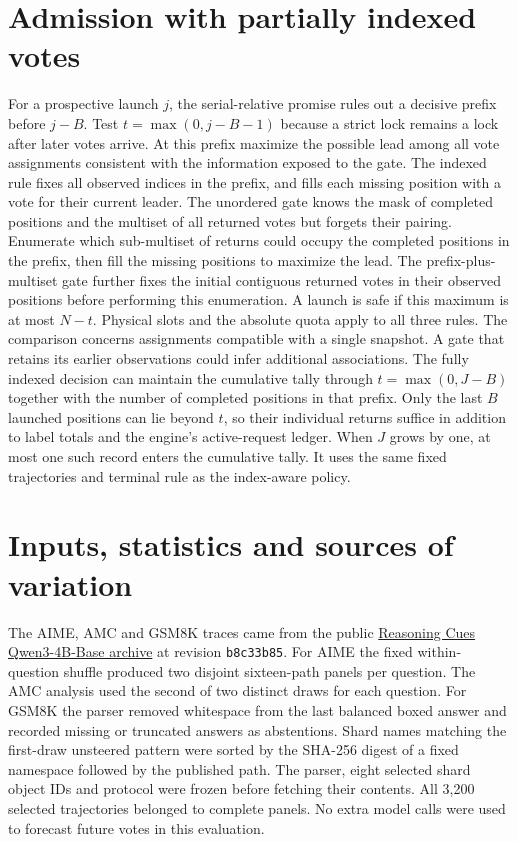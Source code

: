 \section{Admission with partially indexed votes}\label{app:bag}
For a prospective launch $j$, the serial-relative promise rules out a decisive prefix before $j-B$. Test $t=\max(0,j-B-1)$ because a strict lock remains a lock after later votes arrive. At this prefix maximize the possible lead among all vote assignments consistent with the information exposed to the gate. The indexed rule fixes all observed indices in the prefix, and fills each missing position with a vote for their current leader. The unordered gate knows the mask of completed positions and the multiset of all returned votes but forgets their pairing. Enumerate which sub-multiset of returns could occupy the completed positions in the prefix, then fill the missing positions to maximize the lead. The prefix-plus-multiset gate further fixes the initial contiguous returned votes in their observed positions before performing this enumeration. A launch is safe if this maximum is at most $N-t$. Physical slots and the absolute quota apply to all three rules. The comparison concerns assignments compatible with a single snapshot. A gate that retains its earlier observations could infer additional associations. The fully indexed decision can maintain the cumulative tally through $t=\max(0,J-B)$ together with the number of completed positions in that prefix. Only the last $B$ launched positions can lie beyond $t$, so their individual returns suffice in addition to label totals and the engine's active-request ledger. When $J$ grows by one, at most one such record enters the cumulative tally. It uses the same fixed trajectories and terminal rule as the index-aware policy.

\section{Inputs, statistics and sources of variation}\label{app:data}
The AIME, AMC and GSM8K traces came from the public \href{https://huggingface.co/datasets/reasoning-cues/rollouts-qwen4b/tree/b8c33b85a1a6cdfb23b06a5f9d696f52950780e4}{Reasoning Cues Qwen3-4B-Base archive} at revision \texttt{b8c33b85}. For AIME the fixed within-question shuffle produced two disjoint sixteen-path panels per question. The AMC analysis used the second of two distinct draws for each question. For GSM8K the parser removed whitespace from the last balanced boxed answer and recorded missing or truncated answers as abstentions. Shard names matching the first-draw unsteered pattern were sorted by the SHA-256 digest of a fixed namespace followed by the published path. The parser, eight selected shard object IDs and protocol were frozen before fetching their contents. All 3,200 selected trajectories belonged to complete panels. No extra model calls were used to forecast future votes in this evaluation.

